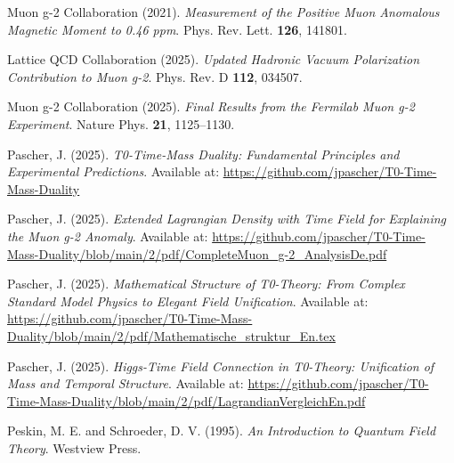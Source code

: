 \documentclass[12pt,a4paper]{article}
\theoremstyle{definition}
\begin{document}
	\begin{thebibliography}{20}
		
		Muon g-2 Collaboration (2021). 
		\textit{Measurement of the Positive Muon Anomalous Magnetic Moment to 0.46 ppm}. 
		Phys. Rev. Lett. \textbf{126}, 141801.
		
		Lattice QCD Collaboration (2025).
		\textit{Updated Hadronic Vacuum Polarization Contribution to Muon g-2}.
		Phys. Rev. D \textbf{112}, 034507.
		
		Muon g-2 Collaboration (2025).
		\textit{Final Results from the Fermilab Muon g-2 Experiment}.
		Nature Phys. \textbf{21}, 1125–1130.
		
		Pascher, J. (2025). 
		\textit{T0-Time-Mass Duality: Fundamental Principles and Experimental Predictions}. 
		Available at: \url{https://github.com/jpascher/T0-Time-Mass-Duality}
		
		Pascher, J. (2025). 
		\textit{Extended Lagrangian Density with Time Field for Explaining the Muon g-2 Anomaly}. 
		Available at: \url{https://github.com/jpascher/T0-Time-Mass-Duality/blob/main/2/pdf/CompleteMuon_g-2_AnalysisDe.pdf}
		
		Pascher, J. (2025). 
		\textit{Mathematical Structure of T0-Theory: From Complex Standard Model Physics to Elegant Field Unification}. 
		Available at: \url{https://github.com/jpascher/T0-Time-Mass-Duality/blob/main/2/pdf/Mathematische_struktur_En.tex}
		
		Pascher, J. (2025). 
		\textit{Higgs-Time Field Connection in T0-Theory: Unification of Mass and Temporal Structure}. 
		Available at: \url{https://github.com/jpascher/T0-Time-Mass-Duality/blob/main/2/pdf/LagrandianVergleichEn.pdf}
		
		Peskin, M. E. and Schroeder, D. V. (1995). 
		\textit{An Introduction to Quantum Field Theory}. 
		Westview Press.
		
	\end{thebibliography}
	
\end{document}
